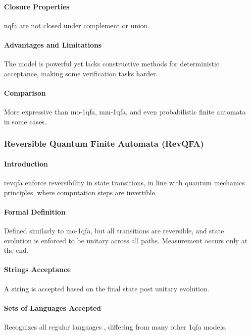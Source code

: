 \paragraph{Closure Properties}
\gls{nqfa} are not closed under complement or union.

\paragraph{Advantages and Limitations}
The model is powerful yet lacks constructive methods for deterministic acceptance, making some verification tasks harder.

\paragraph{Comparison}
More expressive than \gls{mo-1qfa}, \gls{mm-1qfa}, and even probabilistic finite automata in some cases.

\subsubsection{Reversible Quantum Finite Automata (RevQFA)}
\paragraph{Introduction}
\gls{revqfa} enforce reversibility in state transitions, in line with quantum mechanics principles, where computation steps are invertible.

\paragraph{Formal Definition}
Defined similarly to \gls{mo-1qfa}, but all transitions are reversible, and state evolution is enforced to be unitary across all paths. Measurement occurs only at the end.

\paragraph{Strings Acceptance}
A string is accepted based on the final state post unitary evolution.

\paragraph{Sets of Languages Accepted}
Recognizes all regular languages \cite{yamakami2014one}, differing from many other \gls{1qfa} models.


